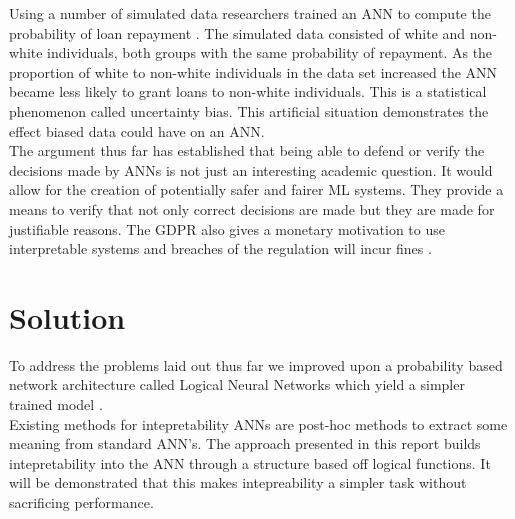 Using a number of simulated data researchers trained an ANN to compute the probability of loan repayment \cite{goodman2016european}. The simulated data consisted of white and non-white individuals, both groups with the same probability of repayment. As the proportion of white to non-white individuals in the data set increased the ANN became less likely to grant loans to non-white individuals. This is a statistical phenomenon called uncertainty bias. This artificial situation demonstrates the effect biased data could have on an ANN.\\

The argument thus far has established that being able to defend or verify the decisions made by ANNs is not just an interesting academic question. It would allow for the creation of potentially safer and fairer ML systems. They provide a means to verify that not only correct decisions are made but they are made for justifiable reasons. The GDPR also gives a monetary motivation to use interpretable systems and breaches of the regulation will incur fines \cite{goodman2016european}.\\

\section{Solution}
To address the problems laid out thus far we improved upon a probability based network architecture called Logical Neural Networks which yield a simpler trained model \cite{LearningLogicalActivations}.\\

Existing methods for intepretability ANNs are post-hoc methods to extract some meaning from standard ANN's. The approach presented in this report builds intepretability into the ANN through a structure based off logical functions. It will be demonstrated that this makes intepreability a simpler task without sacrificing performance.

